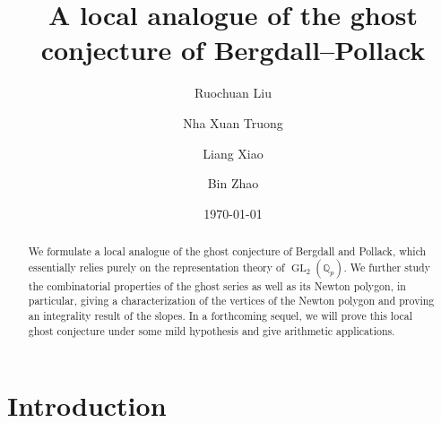 \documentclass[12pt]{amsart}
\theoremstyle{definition}
\numberwithin{equation}{subsection}
\def\QQ{\mathbb{Q}}
\DeclareMathOperator{\GL}{GL}
\begin{document}

\title{A local analogue of the ghost conjecture of Bergdall--Pollack}
\author{Ruochuan Liu}
\address{Ruochuan Liu, School of Mathematical Sciences, Peking University, 5 Yi He Yuan Road, Haidian District, Beijing, 100871, China. }

\author{Nha Xuan Truong}
\address{Nha Xuan Truong, Department of Mathematics, University of Hawaii at Manoa, 2565 McCarthy Mall, Honolulu, HI 96822, U.S.A..}

\author{Liang Xiao}
\address{Liang Xiao, School of Mathematical Sciences,
Peking University.
5 Yi He Yuan Road, Haidian District,
Beijing, 100871, China.}

\author{Bin Zhao}
\address{Bin Zhao, School of Mathematical Sciences, Capital Normal University, Beijing, 100048, China.}
\date{\today}

\begin{abstract}
We formulate a local analogue of the ghost conjecture of Bergdall and Pollack, which essentially relies purely on the representation theory of $\GL_2(\QQ_p)$.  We further study the combinatorial properties of the ghost series as well as its Newton polygon, in particular, giving a characterization of the vertices of the Newton polygon and proving an integrality result of the slopes.
In a forthcoming sequel, we will prove this local ghost conjecture under some mild hypothesis and give arithmetic applications.
\end{abstract}  

\maketitle
\setcounter{tocdepth}{1}
\tableofcontents


\section{Introduction}
\end{document}
